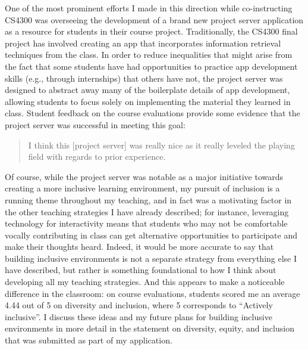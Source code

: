 \documentclass[12pt,letterpaper]{article}
\begin{document}
One of the most prominent efforts I made in this direction while co-instructing CS4300 was overseeing the development of a brand new project server application as a resource for students in their course project.
Traditionally, the CS4300 final project has involved creating an app that incorporates information retrieval techniques from the class.
In order to reduce inequalities that might arise from the fact that some students have had opportunities to practice app development skills (e.g., through internships) that others have not, the project server was designed to abstract away many of the boilerplate details of app development, allowing students to focus solely on implementing the material they learned in class.
Student feedback on the course evaluations provide some evidence that the project server was successful in meeting this goal:
\begin{quote}
I think this [project server] was really nice as it really leveled the playing field with regards to prior experience.
\end{quote}

Of course, while the project server was notable as a major initiative towards creating a more inclusive learning environment, my pursuit of inclusion is a running theme throughout my teaching, and in fact was a motivating factor in the other teaching strategies I have already described; for instance, leveraging technology for interactivity means that students who may not be comfortable vocally contributing in class can get alternative opportunities to participate and make their thoughts heard.
Indeed, it would be more accurate to say that building inclusive environments is not a separate strategy from everything else I have described, but rather is something foundational to how I think about developing all my teaching strategies.
And this appears to make a noticeable difference in the classroom: on course evaluations, students scored me an average 4.44 out of 5 on diversity and inclusion, where 5 corresponds to ``Actively inclusive''.
\iflongdei
I discuss these ideas and my future plans for building inclusive environments in more detail in the statement on diversity, equity, and inclusion that was submitted as part of my application.
\else
%
\fi
\end{document}
